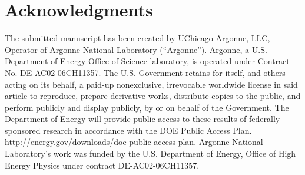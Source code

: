 \documentclass[showpacs,showkeys,preprint,prd,nofootinbib,linenumbers,12pt,superscriptaddress]{revtex4-1}
\begin{document}
\section*{Acknowledgments}
The submitted manuscript has been created by UChicago Argonne, LLC, Operator of Argonne National Laboratory (“Argonne”). Argonne, a U.S.  Department of Energy Office of Science laboratory, is operated under Contract No. DE-AC02-06CH11357. The U.S. Government retains for itself, 
and others acting on its behalf, a paid-up nonexclusive, irrevocable worldwide license in said article to reproduce, prepare derivative works, distribute copies to the public, and perform publicly and display publicly, by or on behalf of the Government.  The Department of Energy will provide public access to these results of federally sponsored research in accordance with the 
DOE Public Access Plan. \url{http://energy.gov/downloads/doe-public-access-plan}. Argonne National Laboratory’s work was funded by the U.S. Department of Energy, Office of High Energy Physics under contract DE-AC02-06CH11357. 



\end{document}
